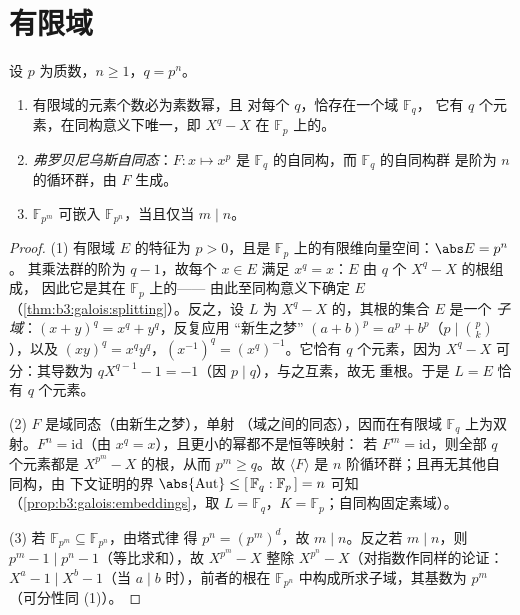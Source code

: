 \section{有限域}

\begin{theorem}\label{thm:b3:galois:finitefields}
设 $p$ 为质数，$n \geq 1$，$q = p^n$。
\begin{enumerate}
  \item 有限域的元素个数必为素数幂，且
        对每个 $q$，恰存在一个域 $\mathbb F_q$，
        它有 $q$ 个元素，在同构意义下唯一，即
        $X^q - X$ 在 $\mathbb F_p$ 上的。
  \item \emph{弗罗贝尼乌斯自同态}：$F
        \colon x \mapsto x^p$ 是 $\mathbb
        F_q$ 的自同构，而 $\mathbb F_q$ 的自同构群
        是阶为 $n$ 的循环群，由 $F$ 生成。
  \item $\mathbb F_{p^m}$ 可嵌入 $\mathbb F_{p^n}$，当且仅当 $m \mid
        n$。
\end{enumerate}
\end{theorem}

\begin{proof}
(1) 有限域 $E$ 的特征为 $p > 0$，且是
$\mathbb F_p$ 上的有限维向量空间：$\abs E = p^n$。
其乘法群的阶为 $q - 1$，故每个 $x \in E$
满足 $x^q = x$：$E$ 由 $q$ 个 $X^q - X$ 的根组成，
因此它是其在 $\mathbb F_p$ 上的——
由此至同构意义下确定 $E$
（\cref{thm:b3:galois:splitting}）。反之，设 $L$ 为
$X^q - X$ 的，其根的集合 $E$ 是一个
\emph{子域}：$(x + y)^q = x^q + y^q$，反复应用
“新生之梦” $(a+b)^p = a^p + b^p$（$p \mid \binom pk$），以及
$(xy)^q = x^qy^q$，$(x^{-1})^q = (x^q)^{-1}$。它恰有 $q$
个元素，因为 $X^q - X$ 可分：其导数为
$qX^{q-1} - 1 = -1$（因 $p \mid q$），与之互素，故无
重根。于是 $L = E$ 恰有 $q$ 个元素。

(2) $F$ 是域同态（由新生之梦），单射
（域之间的同态），因而在有限域 $\mathbb F_q$ 上为双射。$F^n =
\mathrm{id}$（由 $x^q = x$），且更小的幂都不是恒等映射：
若 $F^m = \mathrm{id}$，则全部 $q$ 个元素都是
$X^{p^m} - X$ 的根，从而 $p^m \geq q$。故 $\langle F\rangle$
是 $n$ 阶循环群；且再无其他自同构，由
下文证明的界 $\abs{\operatorname{Aut}} \leq [\,\mathbb F_q :
\mathbb F_p\,] = n$ 可知
（\cref{prop:b3:galois:embeddings}，取 $L = \mathbb F_q$，$K =
\mathbb F_p$；自同构固定素域）。

(3) 若 $\mathbb F_{p^m} \subseteq \mathbb F_{p^n}$，由塔式律
得 $p^n = (p^m)^d$，故 $m \mid n$。反之若 $m \mid n$，则
$p^m - 1 \mid p^n - 1$（等比求和），故 $X^{p^m} - X$ 整除
$X^{p^n} - X$（对指数作同样的论证：$X^{a} - 1 \mid X^{b}
- 1$（当 $a \mid b$ 时），前者的根在
$\mathbb F_{p^n}$ 中构成所求子域，其基数为
$p^m$（可分性同 (1)）。
\end{proof}

